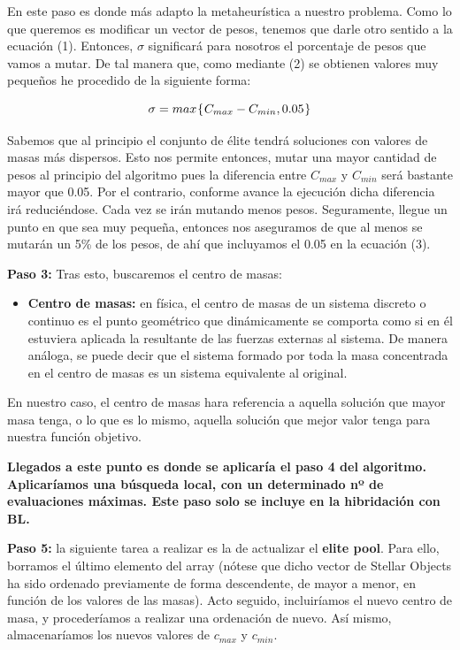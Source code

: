 \documentclass[10pt, a4paper]{article}
\theoremstyle{theorem-style}
\theoremstyle{theorem-style}
\theoremstyle{theorem2-style}
\theoremstyle{definition-style}
\theoremstyle{remark-style}
\theoremstyle{example-style}
\theoremstyle{definition-style}
\theoremstyle{remark-style}
\theoremstyle{remark-style}
\begin{document}
En este paso es donde más adapto la metaheurística a nuestro problema. Como lo que queremos es modificar un vector de pesos, tenemos que darle otro sentido a la ecuación (1). Entonces, $\sigma$ significará para nosotros el porcentaje de pesos que vamos a mutar. De tal manera que, como mediante (2) se obtienen valores muy pequeños he procedido de la siguiente forma: 

\begin{equation}
\sigma = max\hspace{0.02cm}\{\hspace{0.02cm}C_{max} - C_{min}, 0.05\hspace{0.02cm}\}
\end{equation}

Sabemos que al principio el conjunto de élite tendrá soluciones con valores de masas más dispersos. Esto nos permite entonces, mutar una mayor cantidad de pesos al principio del algoritmo pues la diferencia entre $C_{max}$ y $C_{min}$ será bastante mayor que 0.05. Por el contrario, conforme avance la ejecución dicha diferencia irá reduciéndose. Cada vez se irán mutando menos pesos. Seguramente, llegue un punto en que sea muy pequeña, entonces nos aseguramos de que al menos se mutarán un 5\% de los pesos, de ahí que incluyamos el 0.05 en la ecuación (3). 

\textbf{Paso 3: }Tras esto, buscaremos el centro de masas: 

\begin{itemize}
\item \textbf{Centro de masas:} en física, el centro de masas de un sistema discreto o continuo es el punto geométrico que dinámicamente se comporta como si en él estuviera aplicada la resultante de las fuerzas externas al sistema. De manera análoga, se puede decir que el sistema formado por toda la masa concentrada en el centro de masas es un sistema equivalente al original.
\end{itemize}

En nuestro caso, el centro de masas hara referencia a aquella solución que mayor masa tenga, o lo que es lo mismo, aquella solución que mejor valor tenga para nuestra función objetivo. 

\textbf{Llegados a este punto es donde se aplicaría el paso 4 del algoritmo. Aplicaríamos una búsqueda local, con un determinado nº de evaluaciones máximas. Este paso solo se incluye en la hibridación con BL.}

\textbf{Paso 5: } la siguiente tarea a realizar es la de actualizar el \textbf{elite pool}. Para ello, borramos el último elemento del array (nótese que dicho vector de Stellar Objects ha sido ordenado previamente de forma descendente, de mayor a menor, en función de los valores de las masas). Acto seguido, incluiríamos el nuevo centro de masa, y procederíamos a realizar una ordenación de nuevo. Así mismo, almacenaríamos los nuevos valores de $c_{max}$ y $c_{min}$. 
\end{document}
